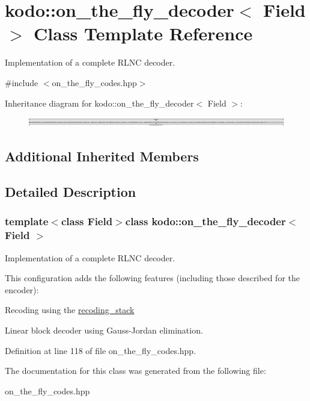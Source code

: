 \hypertarget{classkodo_1_1on__the__fly__decoder}{\section{kodo\-:\-:on\-\_\-the\-\_\-fly\-\_\-decoder$<$ Field $>$ Class Template Reference}
\label{classkodo_1_1on__the__fly__decoder}
}


Implementation of a complete R\-L\-N\-C decoder.  




{\ttfamily \#include $<$on\-\_\-the\-\_\-fly\-\_\-codes.\-hpp$>$}

Inheritance diagram for kodo\-:\-:on\-\_\-the\-\_\-fly\-\_\-decoder$<$ Field $>$\-:\begin{figure}[H]
\begin{center}
\leavevmode
\includegraphics[height=0.427590cm]{classkodo_1_1on__the__fly__decoder}
\end{center}
\end{figure}
\subsection*{Additional Inherited Members}


\subsection{Detailed Description}
\subsubsection*{template$<$class Field$>$class kodo\-::on\-\_\-the\-\_\-fly\-\_\-decoder$<$ Field $>$}

Implementation of a complete R\-L\-N\-C decoder. 

This configuration adds the following features (including those described for the encoder)\-:
\begin{DoxyItemize}
\item Recoding using the \hyperlink{classkodo_1_1recoding__stack}{recoding\-\_\-stack}
\item Linear block decoder using Gauss-\/\-Jordan elimination. 
\end{DoxyItemize}

Definition at line 118 of file on\-\_\-the\-\_\-fly\-\_\-codes.\-hpp.



The documentation for this class was generated from the following file\-:\begin{DoxyCompactItemize}
\item 
on\-\_\-the\-\_\-fly\-\_\-codes.\-hpp\end{DoxyCompactItemize}
